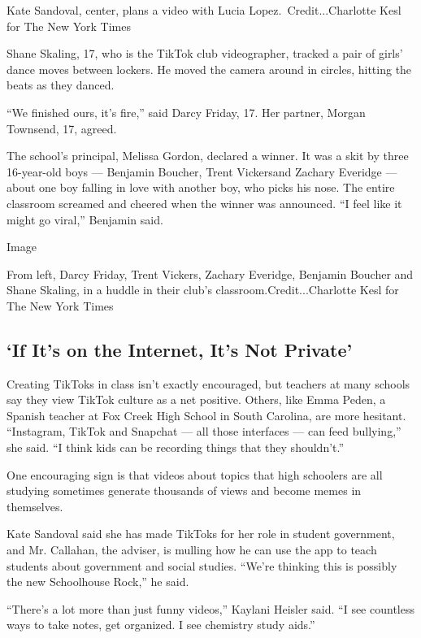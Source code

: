 Kate Sandoval, center, plans a video with Lucia
Lopez.~Credit...Charlotte Kesl for The New York Times

Shane Skaling, 17, who is the TikTok club videographer, tracked a pair
of girls' dance moves between lockers. He moved the camera around in
circles, hitting the beats as they danced.

``We finished ours, it's fire,'' said Darcy Friday, 17. Her partner,
Morgan Townsend, 17, agreed.

The school's principal, Melissa Gordon, declared a winner. It was a skit
by three 16-year-old boys --- Benjamin Boucher, Trent Vickersand Zachary
Everidge --- about one boy falling in love with another boy, who picks
his nose. The entire classroom screamed and cheered when the winner was
announced. ``I feel like it might go viral,'' Benjamin said.

Image

From left, Darcy Friday, Trent Vickers, Zachary Everidge, Benjamin
Boucher and Shane Skaling, in a huddle in their club's
classroom.Credit...Charlotte Kesl for The New York Times

\hypertarget{if-its-on-the-internet-its-not-private}{%
\subsection{`If It's on the Internet, It's Not
Private'}\label{if-its-on-the-internet-its-not-private}}

Creating TikToks in class isn't exactly encouraged, but teachers at many
schools say they view TikTok culture as a net positive. Others, like
Emma Peden, a Spanish teacher at Fox Creek High School in South
Carolina, are more hesitant. ``Instagram, TikTok and Snapchat --- all
those interfaces --- can feed bullying,'' she said. ``I think kids can
be recording things that they shouldn't.''

One encouraging sign is that videos about topics that high schoolers are
all studying sometimes generate thousands of views and become memes in
themselves.

Kate Sandoval said she has made TikToks for her role in student
government, and Mr. Callahan, the adviser, is mulling how he can use the
app to teach students about government and social studies. ``We're
thinking this is possibly the new Schoolhouse Rock,'' he said.

``There's a lot more than just funny videos,'' Kaylani Heisler said. ``I
see countless ways to take notes, get organized. I see chemistry study
aids.''

